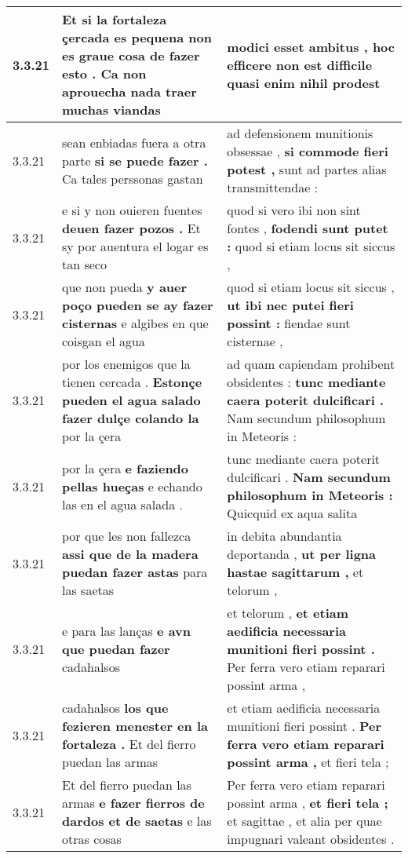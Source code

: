 \begin{tabular}{|p{1cm}|p{6.5cm}|p{6.5cm}|}
3.3.21 & Et si la fortaleza çercada es pequena \textbf{ non es graue cosa de fazer esto . } Ca non aprouecha nada traer muchas viandas & modici esset ambitus , \textbf{ hoc efficere non est difficile } quasi enim nihil prodest \\\hline
3.3.21 & sean enbiadas fuera a otra parte \textbf{ si se puede fazer . } Ca tales perssonas gastan & ad defensionem munitionis obsessae , \textbf{ si commode fieri potest , } sunt ad partes alias transmittendae : \\\hline
3.3.21 & e si y non ouieren fuentes \textbf{ deuen fazer pozos . } Et sy por auentura el logar es tan seco & quod si vero ibi non sint fontes , \textbf{ fodendi sunt putet : } quod si etiam locus sit siccus , \\\hline
3.3.21 & que non pueda \textbf{ y auer poço pueden se ay fazer cisternas } e algibes en que coisgan el agua & quod si etiam locus sit siccus , \textbf{ ut ibi nec putei fieri possint : } fiendae sunt cisternae , \\\hline
3.3.21 & por los enemigos que la tienen cercada . \textbf{ Estonçe pueden el agua salado fazer dulçe colando la } por la çera & ad quam capiendam prohibent obsidentes : \textbf{ tunc mediante caera poterit dulcificari . } Nam secundum philosophum in Meteoris : \\\hline
3.3.21 & por la çera \textbf{ e faziendo pellas hueças } e echando las en el agua salada . & tunc mediante caera poterit dulcificari . \textbf{ Nam secundum philosophum in Meteoris : } Quicquid ex aqua salita \\\hline
3.3.21 & por que les non fallezca \textbf{ assi que de la madera puedan fazer astas } para las saetas & in debita abundantia deportanda , \textbf{ ut per ligna hastae sagittarum , } et telorum , \\\hline
3.3.21 & e para las lanças \textbf{ e avn que puedan fazer } cadahalsos & et telorum , \textbf{ et etiam aedificia necessaria munitioni fieri possint . } Per ferra vero etiam reparari possint arma , \\\hline
3.3.21 & cadahalsos \textbf{ los que fezieren menester en la fortaleza . } Et del fierro puedan las armas & et etiam aedificia necessaria munitioni fieri possint . \textbf{ Per ferra vero etiam reparari possint arma , } et fieri tela ; \\\hline
3.3.21 & Et del fierro puedan las armas \textbf{ e fazer fierros de dardos et de saetas } e las otras cosas & Per ferra vero etiam reparari possint arma , \textbf{ et fieri tela ; } et sagittae , et alia per quae impugnari valeant obsidentes . \\\hline

\end{tabular}
